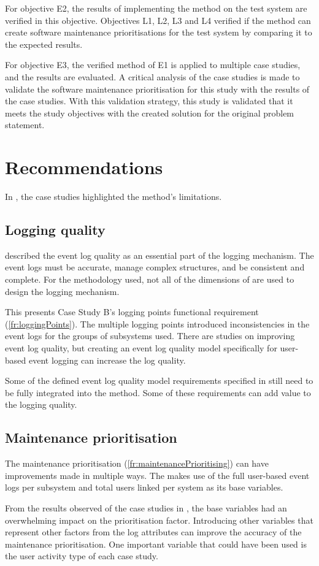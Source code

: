 For objective E2, the results of implementing the method on the test system are verified in this objective. Objectives L1, L2, L3 and L4 verified if the method can create software maintenance prioritisations for the test system by comparing it to the expected results. \par For objective E3, the verified method of E1 is applied to multiple case studies, and the results are evaluated. A critical analysis of the case studies is made to validate the software maintenance prioritisation for this study with the results of the case studies. With this validation strategy, this study is validated that it meets the study objectives with the created solution for the original problem statement.

\section{Recommendations}
In , the case studies highlighted the method's limitations. 

\subsection{Logging quality}
 described the event log quality as an essential part of the logging mechanism. The event logs must be accurate, manage complex structures, and be consistent and complete. For the methodology used, not all of the dimensions of  are used to design the logging mechanism.\par This presents Case Study B's logging points functional requirement (\ref{fr:loggingPoints}). The multiple logging points introduced inconsistencies in the event logs for the groups of subsystems used. There are studies on improving event log quality, but creating an event log quality model specifically for user-based event logging can increase the log quality. \par Some of the defined event log quality model requirements specified in  still need to be fully integrated into the method. Some of these requirements can add value to the logging quality.

\subsection{Maintenance prioritisation}
The maintenance prioritisation (\ref{fr:maintenancePrioritising}) can have improvements made in multiple ways. The  makes use of the full user-based event logs per subsystem and total users linked per system as its base variables.\par From the results observed of the case studies in , the base variables had an overwhelming impact on the prioritisation factor. Introducing other variables that represent other factors from the log attributes can improve the accuracy of the maintenance prioritisation. One important variable that could have been used is the user activity type of each case study.

